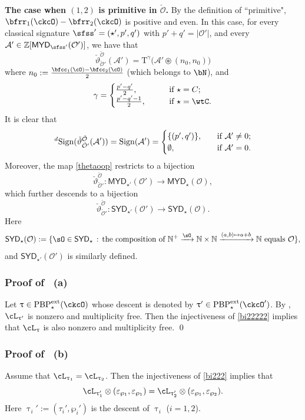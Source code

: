 \documentclass[11pt,a4paper]{amsart}
\def\SYD{{\mathsf{SYD}}}
\def\MYD{{\mathsf{MYD}}}
\def\abs#1{\left|{#1}\right|}
\newcommand{\BN}{{\mathbb {N}}}
\newcommand{\CA}{{\mathcal {A}}}
\newcommand{\CO}{{\mathcal {O}}}
\newcommand{\Z}{\mathbb{Z}}
\newcommand{\be}{\begin {equation}}
\newcommand{\ee}{\end {equation}}
\numberwithin{equation}{section}
\theoremstyle{remark}
\def\PBPes{\mathrm{PBP}^{\mathrm{ext}}_{\star}}
\def\maltese{\mathrm{T}}
\def\SYD{{\mathsf{SYD}}}
\def\MYD{{\mathsf{MYD}}}
\def\ac{\cL}
\begin{document}
 {\bf The case when $(1,2)$ is primitive in $\check \CO$.} 
 By the definition of ``primitive", $\bfrr_{1}(\ckcO)-\bfrr_{2}(\ckcO)$ is  positive and even.  In this case, for every classical signature $\sfss'=(\star', p',q')$ with $p'+q'=\abs{\CO'}$, and every  $\CA'\in \Z[\MYD_{\sfss'}(\CO')]$, we have that 
 \be\label{tlcc1}
 \check{\vartheta}_{\check \CO'}^{\check \CO}(\CA')=\maltese^{\gamma}\big( \CA' 
      \circledast (n_{0},n_{0})\big)
  \ee
where $n_0:=\frac{\bfcc_{1}(\cO)-\bfcc_{2}(\cO)}{2}$ (which belongs to $\bN$), and  %
   \be\label{y}
   \gamma=\begin{cases}
   \frac{p'-q'}{2}, \qquad & \textrm{if $\star=C$};\\
    \frac{p'-q'-1}{2}, \qquad &\textrm{if $\star=\wtC$}.
   \end{cases}
    \ee
 It is clear that
 \be\label{dsign1}
 \dsign(\check{\vartheta}_{\check \CO'}^{\check \CO}(\CA'))=\sign{\CA'}=
 \begin{cases}
   \{(p',q')\},\quad & \textrm{if $\CA'\neq 0$};\\
   \emptyset, \quad & \textrm{if $\CA'=0$}.
 \end{cases}
 \ee
    Moreover, the map \eqref{thetaoop}  restricts to a bijection
    \be\label{bi222}
    \check{\vartheta}_{\check \CO'}^{\check \CO}  :  \MYD_{\star'}(\CO')\rightarrow \MYD_{\star}(\CO),
    \ee
which further descends to a bijection
    \be\label{bi22222}
    \check{\vartheta}_{\check \CO'}^{\check \CO}  :  \SYD_{\star'}(\CO')\rightarrow \SYD_{\star}(\CO).
    \ee
    Here 
    \[
    \SYD_{\star}(\CO):=
    \{\sO\in \SYD_{\star}\,:\,\textrm{the composition of $\BN^+\xrightarrow{\sO}\BN\times \BN\xrightarrow{(a,b)\mapsto a+b}\BN$ equals $\CO$}\},
    \]
    and $\SYD_{\star'}(\CO')$ is similarly defined. 

\subsubsection*{Proof of ~(a)} Let $\uptau\in \PBPes(\ckcO)$ whose descent is denoted by $\uptau'\in \PBPes(\ckcO')$. By , $\ac_{\uptau'}$ is nonzero  and 
 multiplicity free. Then the injectiveness of \eqref{bi22222} implies that $\ac_{\uptau}$ is also nonzero  and  multiplicity free.
 \qed

\smallskip

\subsubsection*{Proof of ~(b)} Assume 
that $\ac_{\uptau_{1}}=\ac_{\uptau_{2}}$. Then the injectiveness of \eqref{bi222} implies that  
\[\ac_{\uptau'_{1}}\otimes
(\varepsilon_{\wp_{1}},\varepsilon_{\wp_{1}})=\ac_{\uptau'_{2}}\otimes
(\varepsilon_{\wp_{1}}, \varepsilon_{\wp_{2}}).
\]
Here $\uptau_i':=(\tau_i',\wp_i')$ is the descent of $\uptau_i$ ($i=1,2$).
\end{document}
